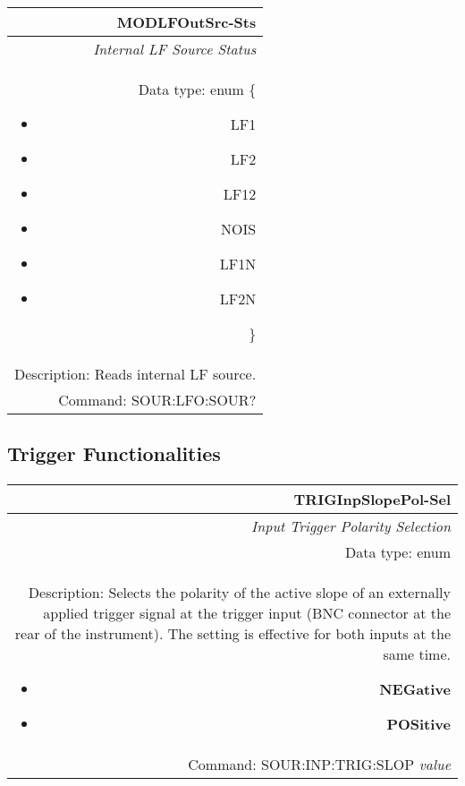 \documentclass[openany]{article}
\begin{document}
		\begin{tabular}{N}
			\hline
			\bfseries MODLFOutSrc-Sts \\ \hline
			\emph{Internal LF Source Status} \\
			Data type: enum \{\begin{itemize}[noitemsep]
				\small
				\item[] LF1
				\item[] LF2
				\item[] LF12
				\item[] NOIS
				\item[] LF1N
				\item[] LF2N

			\end{itemize}\} \\ 
			Description: Reads internal LF source. \\
			Command: SOUR:LFO:SOUR? \\

		\end{tabular}
%

	\subsection{Trigger Functionalities}\label{pvgroup:function} %

		\paragraph{} %

%
		\begin{tabular}{N}
			\hline
			\bfseries TRIGInpSlopePol-Sel \\ \hline
			\emph{Input Trigger Polarity Selection} \\
			Data type: enum \\   
			Description: Selects the polarity of the active slope of an externally applied trigger signal at the trigger input (BNC connector at the rear of the instrument). The setting is effective for both inputs at the same time.\begin{itemize}[noitemsep]
				\small
				\item[] \textbf{NEGative}
                                \item[] \textbf{POSitive}
			\end{itemize} \\
			Command: SOUR:INP:TRIG:SLOP \emph{value} \\

		\end{tabular}
\end{document}
